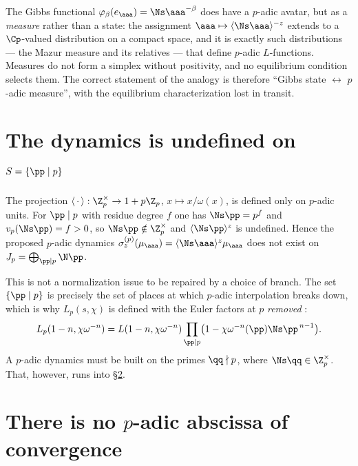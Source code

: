 \begin{remark}\label{XXII:rem:transport}
The Gibbs functional $\varphi_\beta(e_\aaa)=\Ns\aaa^{-\beta}$ does have a $p$-adic avatar,
but as a \emph{measure} rather than a state: the assignment
$\aaa\mapsto\langle\Ns\aaa\rangle^{-z}$ extends to a $\Cp$-valued distribution on a compact
space, and it is exactly such distributions --- the Mazur measure and its relatives --- that
define $p$-adic $L$-functions. Measures do not form a simplex without positivity, and no
equilibrium condition selects them. The correct statement of the analogy is therefore
``Gibbs state $\leftrightarrow$ $p$-adic measure'', with the equilibrium characterization lost
in transit.
\end{remark}

\section{The dynamics is undefined on $S=\{\pp\mid p\}$}

\begin{proposition}\label{XXII:prop:undefined}
The projection $\langle\,\cdot\,\rangle:\Z_p^\times\to1+p\Z_p$, $x\mapsto x/\omega(x)$, is
defined only on $p$-adic units. For $\pp\mid p$ with residue degree $f$ one has
$\Ns\pp=p^{f}$ and $v_p(\Ns\pp)=f>0$, so $\Ns\pp\notin\Z_p^\times$ and
$\langle\Ns\pp\rangle^z$ is undefined. Hence the proposed $p$-adic dynamics
$\sigma^{(p)}_z(\mu_\aaa)=\langle\Ns\aaa\rangle^z\mu_\aaa$ does not exist on
$J_p=\bigoplus_{\pp\mid p}\N\pp$.
\end{proposition}

\begin{remark}\label{XXII:rem:wrongset}
This is not a normalization issue to be repaired by a choice of branch. The set
$\{\pp\mid p\}$ is precisely the set of places at which $p$-adic interpolation breaks down,
which is why $L_p(s,\chi)$ is defined with the Euler factors at $p$ \emph{removed}
\cite{Washington}:
\[
L_p(1-n,\chi\omega^{-n})=L(1-n,\chi\omega^{-n})\prod_{\pp\mid p}\bigl(1-\chi\omega^{-n}(\pp)\Ns\pp^{\,n-1}\bigr).
\]
A $p$-adic dynamics must be built on the primes $\qq\nmid p$, where $\Ns\qq\in\Z_p^\times$.
That, however, runs into \S\ref{XXII:sec:noabscissa}.
\end{remark}

\section{There is no $p$-adic abscissa of convergence}\label{XXII:sec:noabscissa}

